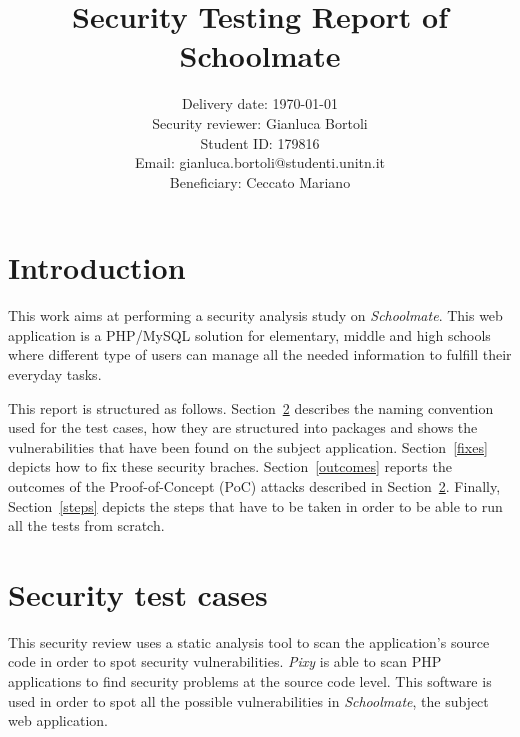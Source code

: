 \documentclass{sig-alternate-05-2015}
\begin{document}
\title{Security Testing Report of Schoolmate}

\author{
    Delivery date: \today\\
    Security reviewer: Gianluca Bortoli\\
    Student ID: 179816\\
    Email: gianluca.bortoli@studenti.unitn.it\\
    Beneficiary: Ceccato Mariano
}
\maketitle


\section{Introduction}
This work aims at performing a security analysis study on \emph{Schoolmate}.
This web application is a PHP/MySQL solution for elementary,
middle and high schools where different type of users can manage all the needed
information to fulfill their everyday tasks.

This report is structured as follows. Section~\ref{tests} describes the naming
convention used for the test cases, how they are structured into packages and shows
the vulnerabilities that have been found on the subject application.
Section~\ref{fixes} depicts how to fix these security braches. Section~\ref{outcomes}
reports the outcomes of the Proof-of-Concept (PoC) attacks described in Section~\ref{tests}.
Finally, Section~\ref{steps} depicts the steps that have to be taken in order to
be able to run all the tests from scratch.


\section{Security test cases}\label{tests}
This security review uses a static analysis tool to scan the application's source code
in order to spot security vulnerabilities.
\emph{Pixy} is able to scan PHP applications to find security problems at the source code level.
This software is used in order to spot all the possible vulnerabilities in \emph{Schoolmate},
the subject web application.
\end{document}
